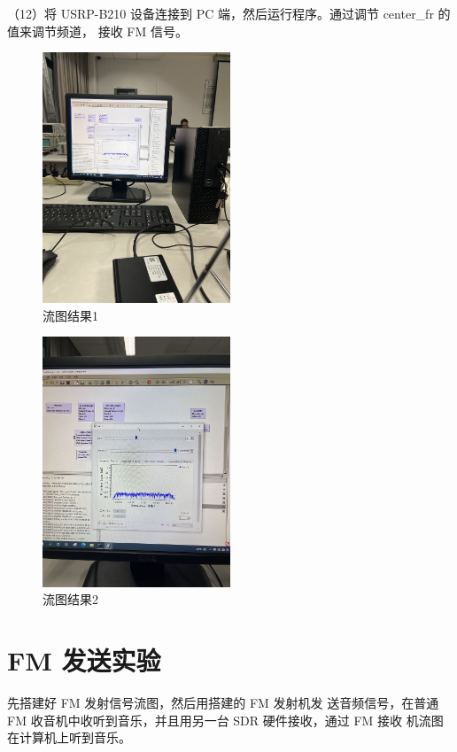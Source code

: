 \documentclass{../source/Experiment}
\begin{document}
（12）将 USRP-B210 设备连接到 PC 端，然后运行程序。通过调节 center\_fr 的值来调节频道， 接收 FM 信号。

\begin{figure}[H]
    \centering
    \includegraphics[width = 0.5\textwidth,angle=270]{lab7/1.jpg}
    \caption{流图结果1}
\end{figure}

\begin{figure}[H]
    \centering
    \includegraphics[width = 0.5\textwidth,angle=270]{lab7/2.jpg}
    \caption{流图结果2}
\end{figure}
\section{FM 发送实验}
先搭建好 FM 发射信号流图，然后用搭建的 FM 发射机发 送音频信号，在普通 FM 收音机中收听到音乐，并且用另一台 SDR 硬件接收，通过 FM 接收 机流图在计算机上听到音乐。
\end{document}
